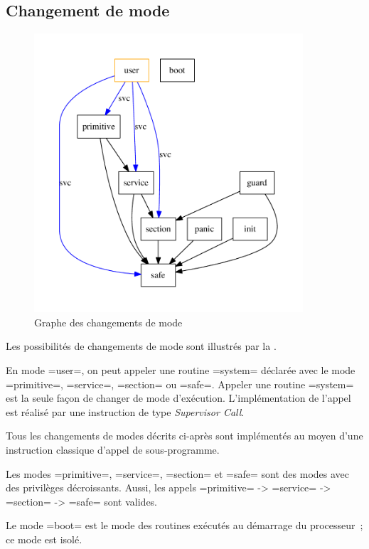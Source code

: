 \subsection{Changement de mode}

\begin{figure}[htbp]
  \centering
  \includegraphics[width=10cm]{chapitres/changement-modes.pdf}
  \caption{Graphe des changements de mode}
\end{figure}

Les possibilités de changements de mode sont illustrés par la .

En mode \omnibus=user=, on peut appeler une routine \omnibus=system= déclarée avec le mode \omnibus=primitive=, \omnibus=service=, \omnibus=section= ou \omnibus=safe=. Appeler une routine \omnibus=system= est la seule façon de changer de mode d'exécution. L'implémentation de l'appel est réalisé par une instruction de type \emph{Supervisor Call}.

Tous les changements de modes décrits ci-après sont implémentés au moyen d'une instruction classique d'appel de sous-programme.

Les modes \omnibus=primitive=, \omnibus=service=, \omnibus=section= et \omnibus=safe= sont des modes avec des privilèges décroissants. Aussi, les appels \omnibus=primitive= -> \omnibus=service= -> \omnibus=section= -> \omnibus=safe= sont valides.

Le mode \omnibus=boot= est le mode des routines exécutés au démarrage du processeur~; ce mode est isolé.

